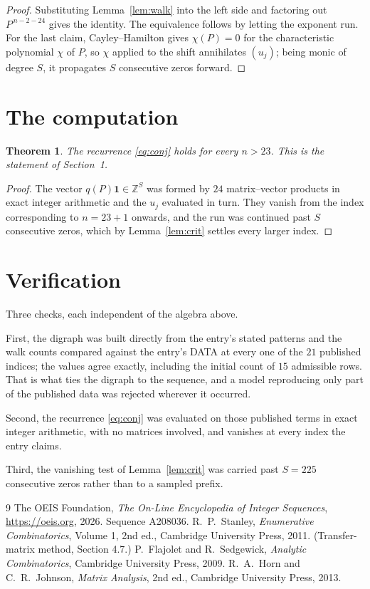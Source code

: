 \documentclass[11pt,a4paper]{article}
\theoremstyle{plain}
\newtheorem{theorem}{Theorem}
\theoremstyle{definition}
\begin{document}
\begin{proof}
Substituting Lemma~\ref{lem:walk} into the left side and factoring out
$P^{\,n-2-24}$ gives the identity. The equivalence follows by letting the exponent
run. For the last claim, Cayley--Hamilton gives $\chi(P)=0$ for the characteristic
polynomial $\chi$ of $P$, so $\chi$ applied to the shift annihilates $(u_j)$; being monic of
degree $S$, it propagates $S$ consecutive zeros forward.
\end{proof}

\section{The computation}

\begin{theorem}
The recurrence \eqref{eq:conj} holds for every $n>23$. This is the statement of
Section~1.
\end{theorem}

\begin{proof}
The vector $q(P)\mathbf{1}\in\mathbb{Z}^{S}$ was formed by $24$ matrix--vector
products in exact integer arithmetic and the $u_j$ evaluated in turn. They vanish from the
index corresponding to $n=23+1$ onwards, and the run was continued past $S$ consecutive
zeros, which by Lemma~\ref{lem:crit} settles every larger index.
\end{proof}

\section{Verification}

Three checks, each independent of the algebra above.

First, the digraph was built directly from the entry's stated patterns and the walk counts
compared against the entry's DATA at every one of the $21$ published indices; the
values agree exactly, including the initial count of $15$ admissible rows. That is
what ties the digraph to the sequence, and a model reproducing only part of the published
data was rejected wherever it occurred.

Second, the recurrence \eqref{eq:conj} was evaluated on those published terms in exact
integer arithmetic, with no matrices involved, and vanishes at every index the entry claims.

Third, the vanishing test of Lemma~\ref{lem:crit} was carried past $S=225$ consecutive
zeros rather than to a sampled prefix.

\begin{thebibliography}{9}
 The OEIS Foundation, \emph{The On-Line Encyclopedia of Integer
Sequences}, \url{https://oeis.org}, 2026. Sequence A208036.
 R.~P.~Stanley, \emph{Enumerative Combinatorics}, Volume 1, 2nd ed.,
Cambridge University Press, 2011. (Transfer-matrix method, Section 4.7.)
 P.~Flajolet and R.~Sedgewick, \emph{Analytic Combinatorics}, Cambridge
University Press, 2009.
 R.~A.~Horn and C.~R.~Johnson, \emph{Matrix Analysis}, 2nd ed., Cambridge
University Press, 2013.
\end{thebibliography}
\end{document}
